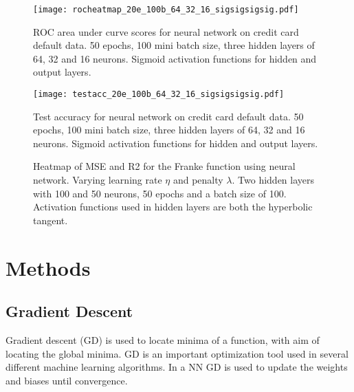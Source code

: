 \documentclass[%
 reprint,
nofootinbib,
 amsmath,amssymb,
 aps,
]{revtex4-2}
\begin{document}
\begin{figure}[h!]
\texttt{[image: rocheatmap\_20e\_100b\_64\_32\_16\_sigsigsigsig.pdf]}
\caption{\label{fig:roc_heatmap_NN_CC} ROC area under curve scores for neural network on credit card default data. 50 epochs, 100 mini batch size, three hidden layers of 64, 32 and 16 neurons. Sigmoid activation functions for hidden and output layers.}
\end{figure}

\begin{figure}[h!]
\texttt{[image: testacc\_20e\_100b\_64\_32\_16\_sigsigsigsig.pdf]}
\caption{\label{fig:test_acc_NN_CC} Test accuracy for neural network on credit card default data. 50 epochs, 100 mini batch size, three hidden layers of 64, 32 and 16 neurons. Sigmoid activation functions for hidden and output layers.}
\end{figure}

\begin{figure}[h!]
\caption{Heatmap of MSE and R2 for the Franke function using neural network. Varying learning rate $\eta$ and penalty $\lambda$. Two hidden layers with 100 and 50 neurons, 50 epochs and a batch size of 100. Activation functions used in hidden layers are both the hyperbolic tangent.}
\label{fig:mse_r2_NN}
\end{figure}

\section{Methods}\label{sec:methods}

\subsection{Gradient Descent}\label{sec:gradient_descent}
Gradient descent (GD) is used to locate minima of a function, with aim of locating the global minima. GD is an important optimization tool used in several different machine learning algorithms. In a NN GD is used to update the weights and biases until convergence.
\end{document}
